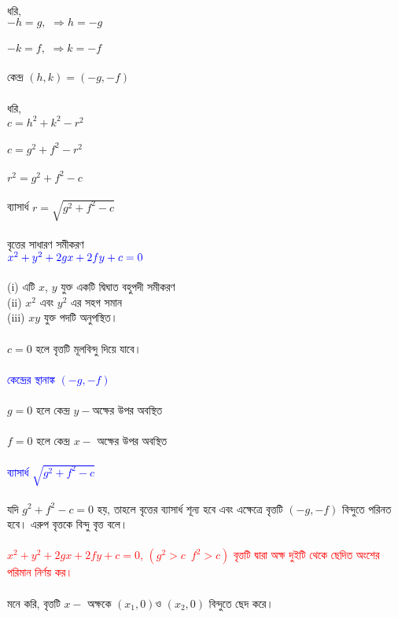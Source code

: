 \documentclass{article}
\begin{document}
\\
ধরি,\\ 
$-h=g,\,\,\Rightarrow h=-g$\\
\\
$-k=f,\,\,\Rightarrow k=-f$\\
\\
কেন্দ্র $(h,k)=(-g,-f)$\\
\\ 
ধরি,\\
$c=h^2+k^2-r^2$\\
\\
$c=g^2+f^2-r^2$\\
\\ 
$r^2=g^2+f^2-c$\\
\\ 
ব্যাসার্ধ $r=\sqrt{g^2+f^2-c}$\\
\\ 
	বৃত্তের সাধারণ সমীকরণ \\
	$\textcolor{blue}{x^2+y^2+2gx+2fy+c=0}$\\
	\\ 
	(i) এটি $x$, $y$ যুক্ত একটি দ্বিঘাত বহুপদী সমীকরণ \\
	(ii) $x^2$ এবং $y^2$ এর সহগ সমান\\
	(iii) $xy$ যুক্ত পদটি অনুপস্থিত। \\
	\\
	$c=0$ হলে বৃত্তটি মূলবিন্দু দিয়ে যাবে।\\
	\\ 
\textcolor{blue}{কেন্দ্রের স্থানাঙ্ক	$(-g,-f)$}\\
\\
$g=0$ হলে কেন্দ্র $y-$অক্ষের উপর অবস্থিত\\
\\
$f=0$ হলে কেন্দ্র $x-$  অক্ষের উপর অবস্থিত\\ 
\\ 
\textcolor{blue}{ব্যাসার্ধ	$\sqrt{g^2+f^2-c}$}\\
\\
যদি $g^2+f^2-c=0$ হয়, তাহলে বৃত্তের ব্যাসার্ধ শূন্য হবে এবং এক্ষেত্রে বৃত্তটি  $(-g,-f)$ বিন্দুতে পরিনত হবে। এরুপ বৃত্তকে বিন্দু বৃত্ত বলে। \\
\\ 
\textcolor{red}{$x^2+y^2+2gx+2fy+c=0$, $(g^2>c\,\,\,f^2>c)$ বৃত্তটি দ্বারা অক্ষ দুইটি থেকে ছেদিত অংশের পরিমান নির্ণয় কর। }\\
\\
মনে করি, বৃত্তটি $x-$ অক্ষকে $(x_1,0)$ও $(x_2,0)$ বিন্দুতে ছেদ করে। \\
\\
\end{document}
